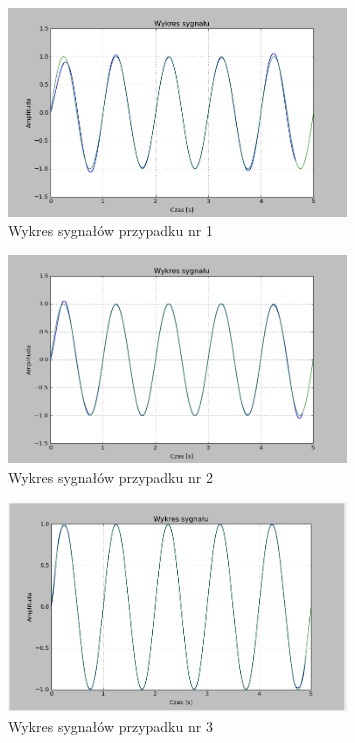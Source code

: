 \documentclass{article}
\begin{document}
    \begin{figure}[h!]
        \centering
        \includegraphics[width=0.8\textwidth]{img/1/sinc3.png}
        \caption{Wykres sygnałów przypadku nr 1}
    \end{figure}
    \FloatBarrier

    \begin{figure}[h!]
        \centering
        \includegraphics[width=0.8\textwidth]{img/1/sinc5.png}
        \caption{Wykres sygnałów przypadku nr 2}
    \end{figure}
    \FloatBarrier

    \begin{figure}[h!]
        \centering
        \includegraphics[width=0.8\textwidth]{img/1/sinc10.png}
        \caption{Wykres sygnałów przypadku nr 3}
    \end{figure}
    \FloatBarrier
\end{document}
